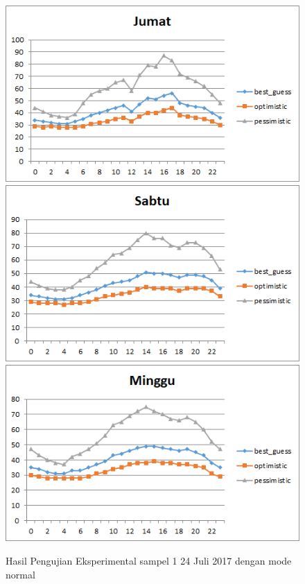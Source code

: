 \begin{figure}[H]
				\centering		
				\includegraphics[]{Gambar/jumatsampel124072017normal.png}
				\includegraphics[]{Gambar/sabtusampel124072017normal.png}
				\includegraphics[]{Gambar/minggusampel124072017normal.png}
				\caption[Hasil Pengujian Eksperimental]{Hasil Pengujian Eksperimental sampel 1 24 Juli 2017 dengan mode normal}
				\label{fig:eksperimentalsampel2124072017normal}
\end{figure}

